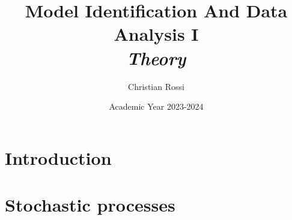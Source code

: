 \documentclass[12pt, a4paper]{report}
\title{Model Identification And Data Analysis I \\ \textit{Theory}}
\author{Christian Rossi}
\date{Academic Year 2023-2024}
\begin{document}
    \maketitle

    

    \cleardoublepage

    \tableofcontents

    \cleardoublepage

    \chapter{Introduction}
    
    

    \chapter{Stochastic processes}
    
    
    
    
    
    
    
\end{document}
